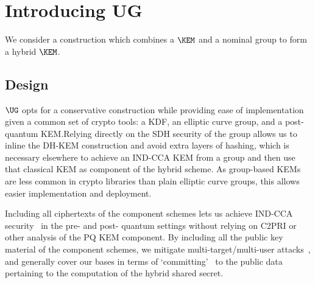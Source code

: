 \section{Introducing UG}\label{sec:ug}

We consider a construction which combines a $\KEM$ and a nominal group to
form a hybrid $\KEM$.

\subsection{Design}
%
$\UG$ opts for a conservative construction while providing ease of
implementation given a common set of crypto tools: a KDF, an elliptic
curve group, and a post-quantum KEM.Relying directly on the SDH security
of the group allows us to inline the DH-KEM construction and avoid extra
layers of hashing, which is necessary elsewhere to achieve an IND-CCA KEM
from a group and then use that classical KEM as component of the hybrid
scheme. As group-based KEMs are less common in crypto libraries than
plain elliptic curve groups, this allows easier implementation and
deployment.

Including all ciphertexts of the component schemes lets us achieve
IND-CCA security~\cite{PKC:GiaHeuPoe18} in the pre- and post- quantum
settings without relying on C2PRI or other analysis of the PQ KEM
component. By including all the public key material of the component
schemes, we mitigate multi-target/multi-user
attacks~\cite{EPRINT:GlaHovSte25}, and generally cover our bases in terms
of `committing'~\cite{CCS:CreDaxMed24} to the public data pertaining to
the computation of the hybrid shared secret.
%

